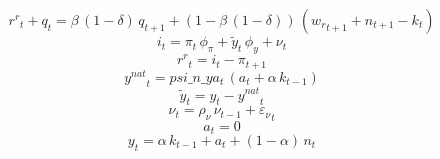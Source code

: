 \documentclass[10pt,a4paper]{article}
\begin{document}
\begin{dmath}
{r^r}_{t}+{q}_{t}={\beta}\, \left(1-{\delta}\right)\, {q}_{t+1}+\left(1-{\beta}\, \left(1-{\delta}\right)\right)\, \left({w_r}_{t+1}+{n}_{t+1}-{k}_{t}\right)
\end{dmath}
\begin{dmath}
{i}_{t}={\pi}_{t}\, {\phi_{\pi}}+{\tilde y}_{t}\, {\phi_{y}}+{\nu}_{t}
\end{dmath}
\begin{dmath}
{r^r}_{t}={i}_{t}-{\pi}_{t+1}
\end{dmath}
\begin{dmath}
{y^{nat}}_{t}=psi\_n\_ya_{t}\, \left({a}_{t}+{\alpha}\, {k}_{t-1}\right)
\end{dmath}
\begin{dmath}
{\tilde y}_{t}={y}_{t}-{y^{nat}}_{t}
\end{dmath}
\begin{dmath}
{\nu}_{t}={\rho_{\nu}}\, {\nu}_{t-1}+{\varepsilon_\nu}_{t}
\end{dmath}
\begin{dmath}
{a}_{t}=0
\end{dmath}
\begin{dmath}
{y}_{t}={\alpha}\, {k}_{t-1}+{a}_{t}+\left(1-{\alpha}\right)\, {n}_{t}
\end{dmath}
\end{document}
